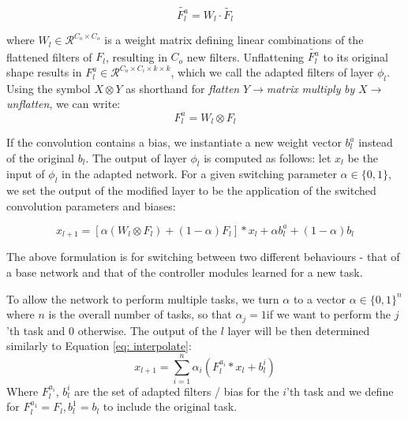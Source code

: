 \documentclass[10pt,journal,compsoc]{IEEEtran}
\begin{document}
\begin{equation}
\tilde{F_{l}^{a}}=W_{l}\cdot\tilde{F_{l}}
\end{equation}

where $W_{l}\in\mathcal{R}^{C_{o}\times C_{o}}$ is a weight matrix
defining linear combinations of the flattened filters of $F_{l}$,
resulting in $C_{o}$ new filters. Unflattening $\tilde{F_{l}^{a}}$
to its original shape results in $F_{l}^{a}\in\mathcal{R}^{C_{o}\times C_{i}\times k\times k}$,
which we call the adapted filters of layer $\phi_{l}$. Using the
symbol $X\otimes Y$ as shorthand for \emph{flatten} $Y$$\rightarrow$\emph{matrix}
\emph{multiply} \emph{by} $X$$\rightarrow$\emph{unflatten}, we can
write: 
\begin{equation}
F_{l}^{a}=W_{l}\otimes F_{l}
\end{equation}

If the convolution contains a bias, we instantiate a new weight vector
$b_{l}^{a}$ instead of the original $b_{l}$. The output of layer
$\phi_{l}$ is computed as follows: let $x_{l}$ be the input of $\phi_{l}$
in the adapted network. For a given switching parameter $\alpha\in\{0,1\}$,
we set the output of the modified layer to be the application of the
switched convolution parameters and biases: 

\begin{equation}
x_{l+1}=[\alpha(W_{l}\otimes F_{l})+(1-\alpha)F_{l}]\ast x_{l}+\alpha b_{l}^{a}+(1-\alpha)b_{l}\label{eq: interpolate}
\end{equation}

The above formulation is for switching between two different behaviours
- that of a base network and that of the controller modules learned
for a new task. 

To allow the network to perform multiple tasks, we turn $\alpha$
to a vector $\alpha\in\{0,1\}^{n}$ where $n$ is the overall number
of tasks, so that $\alpha_{j}=1$if we want to perform the $j$'th
task and 0 otherwise. The output of the $l$ layer will be then determined
similarly to Equation \ref{eq: interpolate}:
\[
x_{l+1}={\ensuremath{\sum}}_{i=1}^{n}\alpha_{i}(F_{l}^{a_{i}}\ast x_{l}+b_{l}^{i})
\]
 Where $F_{l}^{a_{i}}$, $b_{l}^{i}$ are the set of adapted filters
/ bias for the $i$'th task and we define for $F_{l}^{a_{1}}=F_{l},b_{l}^{1}=b_{l}$
to include the original task. 
\end{document}
